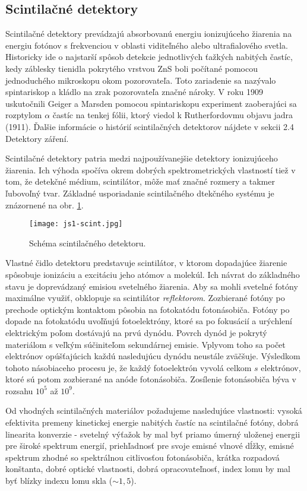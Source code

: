 \documentclass[../../main.tex]{subfiles}
\begin{document}
\subsection{Scintilačné detektory}

Scintilačné detektory prevádzajú absorbovanú energiu ionizujúceho žiarenia na energiu fotónov s frekvenciou v oblasti viditeľného alebo ultrafialového svetla. Historicky ide o najstarší spôsob detekcie jednotlivých ťažkých nabitých častíc, kedy záblesky tienidla pokrytého vrstvou ZnS boli počítané pomocou jednoduchého mikroskopu okom pozorovateľa. Toto zariadenie sa nazývalo spintariskop a kládlo na zrak pozorovateľa značné nároky. V roku 1909 uskutočnili Geiger a Marsden pomocou spintariskopu experiment zaoberajúci sa rozptylom $\alpha$ častíc na tenkej fólii, ktorý viedol k Rutherfordovmu objavu jadra (1911). Ďalšie informácie o histórií scintilačných detektorov nájdete v sekcii 2.4 Detektory záření.

Scintilačné detektory patria medzi najpoužívanejšie detektory ionizujúceho žiarenia. Ich výhoda spočíva okrem dobrých spektrometrických vlastností tiež v tom, že detekčné médium, scintilátor, môže mať značné rozmery a takmer ľubovoľný tvar. Základné usporiadanie scintilačného dtekčného systému je znázornené na obr. \ref{js1:img:schemascint}. 

\begin{figure}[h]
\centering
\texttt{[image: js1-scint.jpg]}
\caption{Schéma scintilačného detektoru.}
\label{js1:img:schemascint}
\end{figure}

Vlastné čidlo detektoru predstavuje scintilátor, v ktorom dopadajúce žiarenie spôsobuje ionizáciu a excitáciu jeho atómov a molekúl. Ich návrat do základného stavu je doprevádzaný emisiou svetelného žiarenia. Aby sa mohli svetelné fotóny maximálne využiť, obklopuje sa scintilátor \textit{reflektorom}. Zozbierané fotóny po prechode optickým kontaktom pôsobia na fotokatódu fotonásobiča. Fotóny po dopade na fotokatódu uvoľňujú fotoelektróny, ktoré sa po fokusácií a urýchlení elektrickým poľom dostávajú na prvú dynódu. Povrch dynód je pokrytý materiálom s veľkým súčiniteľom sekundárnej emisie. Vplyvom toho sa počet elektrónov opúšťajúcich každú nasledujúcu dynódu neustále zväčšuje. Výsledkom tohoto násobiaceho procesu je, že každý fotoelektrón vyvolá celkom $s$ elektrónov, ktoré sú potom zozbierané na anóde fotonásobiča. Zosílenie fotonásobiča býva v rozsahu $10^5$ až $10^9$.

Od vhodných scintilačných materiálov požadujeme nasledujúce vlastnosti: vysoká efektivita premeny kinetickej energie nabitých častíc na scintilačné fotóny, dobrá linearita konverzie - svetelný výťažok by mal byť priamo úmerný uloženej energii pre široké spektrum energií, priehľadnosť pre svoje emisné vlnové dĺžky, emisné spektrum zhodné so spektrálnou citlivosťou fotonásobiča, krátka rozpadová konštanta, dobré optické vlastnosti, dobrá opracovateľnosť, index lomu by mal byť blízky indexu lomu skla ($\sim 1,5$).
\end{document}
